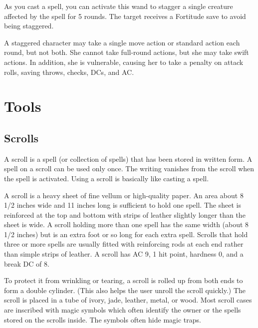 
 As you cast a spell, you can activate this wand to stagger a single creature affected by the spell for 5 rounds. The target receives a Fortitude save to avoid being staggered.

A staggered character may take a single move action or standard action each round, but not both. She cannot take full-round actions, but she may take swift actions. In addition, she is vulnerable, causing her to take a  penalty on attack rolls, saving throws, checks, DCs, and AC.


\section{Tools}

\subsection{Scrolls}
A scroll is a spell (or collection of spells) that has been stored in written form. A spell on a scroll can be used only once. The writing vanishes from the scroll when the spell is activated. Using a scroll is basically like casting a spell.

 A scroll is a heavy sheet of fine vellum or high-quality paper. An area about 8 1/2 inches wide and 11 inches long is sufficient to hold one spell. The sheet is reinforced at the top and bottom with strips of leather slightly longer than the sheet is wide. A scroll holding more than one spell has the same width (about 8 1/2 inches) but is an extra foot or so long for each extra spell. Scrolls that hold three or more spells are usually fitted with reinforcing rods at each end rather than simple strips of leather. A scroll has AC 9, 1 hit point, hardness 0, and a break DC of 8.

To protect it from wrinkling or tearing, a scroll is rolled up from both ends to form a double cylinder. (This also helps the user unroll the scroll quickly.) The scroll is placed in a tube of ivory, jade, leather, metal, or wood. Most scroll cases are inscribed with magic symbols which often identify the owner or the spells stored on the scrolls inside. The symbols often hide magic traps.

